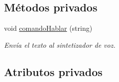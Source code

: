 \subsection*{Métodos privados}
\begin{DoxyCompactItemize}
\item 
void \hyperlink{classespacio_teclado_a02159fdf23f2e54c39be99dce372011f}{comando\+Hablar} (string)
\begin{DoxyCompactList}\small\item\em Envía el texto al sintetizador de voz. \end{DoxyCompactList}\end{DoxyCompactItemize}
\subsection*{Atributos privados}
